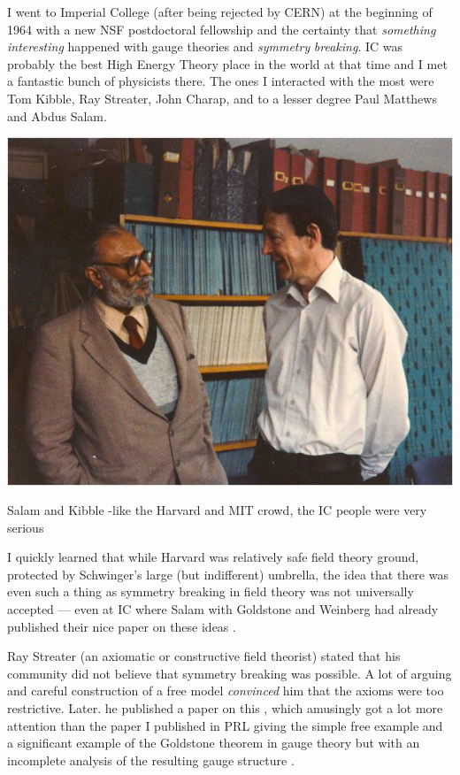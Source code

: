 \documentclass[preprintnumbers,12pt]{revtex4-2}
\begin{document}
I went to Imperial College (after being rejected by CERN) at the
beginning of 1964 with a new NSF postdoctoral fellowship and the
certainty that \emph{something} \emph{interesting} happened with
gauge theories and \emph{symmetry} \emph{breaking}. IC was probably
the best High Energy Theory place in the world at that time and I met
a fantastic bunch of physicists there. The ones I interacted with the
most were Tom Kibble, Ray Streater, John Charap, and to a lesser
degree Paul Matthews and Abdus Salam.

\begin{center}
  \includegraphics[scale=0.6]{sk.jpg}

  Salam and Kibble -like the Harvard and MIT crowd, the IC people were very serious
\end{center}


I quickly learned that while Harvard was relatively safe field theory
ground, protected by Schwinger's large (but indifferent) umbrella, the
idea that there was even such a thing as symmetry breaking in field
theory was not universally accepted --- even at IC where Salam
with Goldstone and Weinberg had already published their nice paper on
these ideas \cite{gsw;1962}.

Ray Streater (an axiomatic or constructive field theorist) stated that
his community did not believe that symmetry breaking was possible. A
lot of arguing and careful construction of a free model
\emph{convinced} him that the axioms were too restrictive. Later. he
published a paper on this \cite{rs;1965}, which amusingly got a lot more attention
than the paper I published in PRL giving the simple free example and a
significant example of the Goldstone theorem in gauge theory but  with
an incomplete analysis of the resulting gauge structure \cite{ggfu;1964}.
\end{document}
